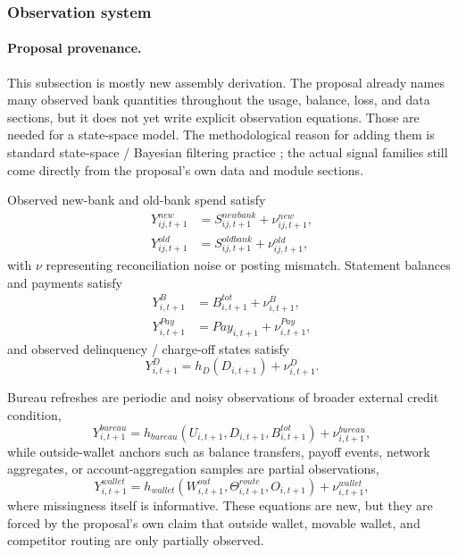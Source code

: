 \documentclass[11pt]{article}
\newcommand{\1}{\mathbf{1}}
\begin{document}
\subsubsection{Observation system}
\label{subsec:state-space-observations}

\paragraph{Proposal provenance.}
This subsection is mostly new assembly derivation. The proposal already names
many observed bank quantities throughout the usage, balance, loss, and data
sections, but it does not yet write explicit observation equations. Those are
needed for a state-space model. The methodological reason for adding them is
standard state-space / Bayesian filtering practice
\citep{durbinkoopman2012ssm,westharrison1997bfdm,doucet2001smc}; the actual
signal families still come directly from the proposal's own data and module
sections.

Observed new-bank and old-bank spend satisfy
\begin{align}
  Y^{new}_{ij,t+1} &= S^{newbank}_{ij,t+1} + \nu^{new}_{ij,t+1},
    \label{eq:ss-obs-new}\\
  Y^{old}_{ij,t+1} &= S^{oldbank}_{ij,t+1} + \nu^{old}_{ij,t+1},
    \label{eq:ss-obs-old}
\end{align}
with $\nu$ representing reconciliation noise or posting mismatch.
Statement balances and payments satisfy
\begin{align}
  Y^B_{i,t+1} &= B^{tot}_{i,t+1} + \nu^B_{i,t+1},
    \label{eq:ss-obs-balance}\\
  Y^{Pay}_{i,t+1} &= Pay_{i,t+1} + \nu^{Pay}_{i,t+1},
    \label{eq:ss-obs-payment}
\end{align}
and observed delinquency / charge-off states satisfy
\begin{equation}
  Y^D_{i,t+1} = h_D(D_{i,t+1}) + \nu^{D}_{i,t+1}.
  \label{eq:ss-obs-delinquency}
\end{equation}

Bureau refreshes are periodic and noisy observations of broader external credit
condition,
\begin{equation}
  Y^{bureau}_{i,t+1}
  =
  h_{bureau}(U_{i,t+1},D_{i,t+1},B^{tot}_{i,t+1}) + \nu^{bureau}_{i,t+1},
  \label{eq:ss-obs-bureau}
\end{equation}
while outside-wallet anchors such as balance transfers, payoff events, network
aggregates, or account-aggregation samples are partial observations,
\begin{equation}
  Y^{wallet}_{i,t+1}
  =
  h_{wallet}(W^{out}_{i,t+1},\Theta^{route}_{i,t+1},O_{i,t+1})
  + \nu^{wallet}_{i,t+1},
  \label{eq:ss-obs-wallet}
\end{equation}
where missingness itself is informative. These equations are new, but they are
forced by the proposal's own claim that outside wallet, movable wallet, and
competitor routing are only partially observed.
\end{document}
